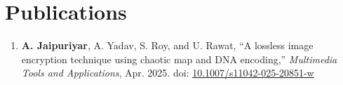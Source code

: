 \documentclass[10pt]{article}
\newcommand{\rside}[1]{
  \hfill {\normalfont\color{accent} #1}%
}
\begin{document}

\section{Publications}
\begin{enumerate}
  \item \textbf{A. Jaipuriyar}, A. Yadav, S. Roy, and U. Rawat, “A lossless image encryption technique using chaotic map and DNA encoding,” \textit{Multimedia Tools and Applications}, Apr. 2025. doi: \href{https://doi.org/10.1007/s11042-025-20851-w}{10.1007/s11042-025-20851-w}
\end{enumerate}

\end{document}
